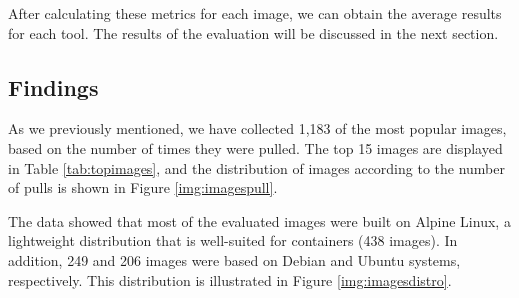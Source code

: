 After calculating these metrics for each image, we can obtain the average results for each tool. The results of the evaluation will be discussed in the next section.

\subsection{Findings}


As we previously mentioned, we have collected 1,183 of the most popular images, based on the number of times they were pulled. The top 15 images are displayed in Table \ref{tab:topimages}, and the distribution of images according to the number of pulls is shown in Figure \ref{img:imagespull}. 

The data showed that most of the evaluated images were built on Alpine Linux, a lightweight distribution that is well-suited for containers (438 images). In addition, 249 and 206 images were based on Debian and Ubuntu systems, respectively. This distribution is illustrated in Figure \ref{img:imagesdistro}.


